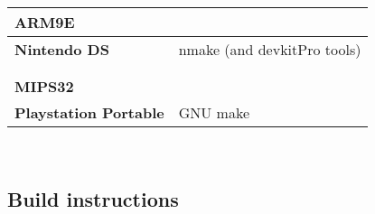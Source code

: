 \begin{tabular}{l l}
{\bf{\large ARM9E}} &                                          \\
\hline\hline
{\bf Nintendo DS} & nmake (and devkitPro\cite{devkitPro} tools)\\
\hline
                   &                                           \\
                   &                                           \\

{\bf{\large MIPS32}} &                                         \\
\hline\hline
{\bf Playstation Portable} & GNU make                          \\
\hline

\end{tabular}\\

\pagebreak

\subsection{Build instructions}


